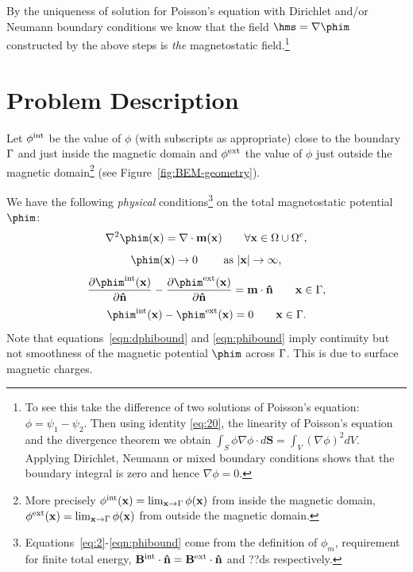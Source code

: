 By the uniqueness of solution for Poisson's equation with Dirichlet and/or Neumann boundary conditions we know that the field $ \hms = \nabla \phim$  constructed by the above steps is \emph{the} magnetostatic field.\footnote{To see this take the difference of two solutions of Poisson's equation: $\phi = \psi_1 - \psi_2$. Then using identity \eqref{eq:20}, the linearity of Poisson's equation and the divergence theorem we obtain $\int_S \phi \nabla \phi \cdot d \mathbf{S} = \int_V (\nabla \phi)^2 dV$. Applying Dirichlet, Neumann or mixed boundary conditions shows that the boundary integral is zero and hence $\nabla \phi = 0$.}

\section{Problem Description}
\label{sec:problem-description}
Let $\phi^{\text{int}}$ be the value of $\phi$ (with subscripts as appropriate) close to the boundary ${\Gamma}$ and just inside the magnetic domain  and $\phi^{\text{ext}}$ the value of $\phi$ just outside the magnetic domain\footnote{More precisely $\phi^{\text{int}}(\mathbf{x}) = \lim_{\mathbf{x} \rightarrow {\Gamma}} \phi(\mathbf{x})$ from inside the magnetic domain, $\phi^{\text{ext}}(\mathbf{x}) = \lim_{\mathbf{x} \rightarrow {\Gamma}} \phi(\mathbf{x})$ from outside the magnetic domain.} (see Figure~\ref{fig:BEM-geometry}).

\pagebreak %

We have the following \emph{physical} conditions\footnote{Equations~\eqref{eq:2}-\eqref{eqn:phibound} come from the definition of $\phi_m$, requirement for finite total energy, $\mathbf{B}^\text{int} \cdot \mathbf{\hat{n}} = \mathbf{B}^\text{ext} \cdot \mathbf{\hat{n}}$ and ??ds respectively.} on the total magnetostatic potential $\phim$:
\begin{equation}
  \lap \phim(\xv) = \nabla \cdot \mv(\xv) \qquad \forall \xv \in \magd \cup \extd,
  \label{eq:2}
\end{equation}
\begin{equation}
  \phim(\xv) \rightarrow 0 \qquad \text{ as } \abs{\xv} \rightarrow \infty,
\end{equation}
\begin{equation}
  \pd{\phim^\inte(\xv)}{\nv} - \pd{\phim^\exte(\xv)}{\nv} = \mv \cdot \nv \qquad \xv \in \boundd,
  \label{eqn:dphibound}
\end{equation}
\begin{equation}
  \phim^\inte(\xv) - \phim^\exte(\xv)  = 0 \qquad \xv \in \boundd.
  \label{eqn:phibound}
\end{equation}
Note that equations~\eqref{eqn:dphibound} and \eqref{eqn:phibound} imply continuity but not smoothness of the magnetic potential $\phim$ across ${\Gamma}$. This is due to surface magnetic charges.

